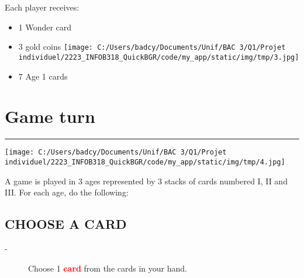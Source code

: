 \documentclass{scrartcl}%
\begin{document}
%
Each player receives:
%
\begin{itemize}%
\item%
%
 1 Wonder card
%
\item%
%
 3 gold coins%
\texttt{[image: C:/Users/badcy/Documents/Unif/BAC 3/Q1/Projet individuel/2223\_INFOB318\_QuickBGR/code/my\_app/static/img/tmp/3.jpg]}%

%
\item%
%
 7 Age 1 cards
%
\end{itemize}

%
\sectionfont{\color{red}}%
\subsectionfont{\color{red}}%
\subsubsectionfont{\color{red}}%
\section{ Game turn
}%
\label{sec:Gameturn}%
\textcolor{red}{\rule{18cm}{0.07cm}}\break%
%
\begin{center}\texttt{[image: C:/Users/badcy/Documents/Unif/BAC 3/Q1/Projet individuel/2223\_INFOB318\_QuickBGR/code/my\_app/static/img/tmp/4.jpg]}\end{center}%

%
A game is played in 3 ages represented by 3 stacks of cards numbered I, II and III. For each age, do the following:


%
\subsection{ CHOOSE A CARD
}%
\label{subsec:CHOOSEACARD}%
\begin{description}%
\item[{-} ]%
%
 Choose 1 %
\textcolor{red}{%
\textbf{card}%
}%
\textit{ }%
 from the cards in your hand.
%
\end{description}

%
\end{document}

